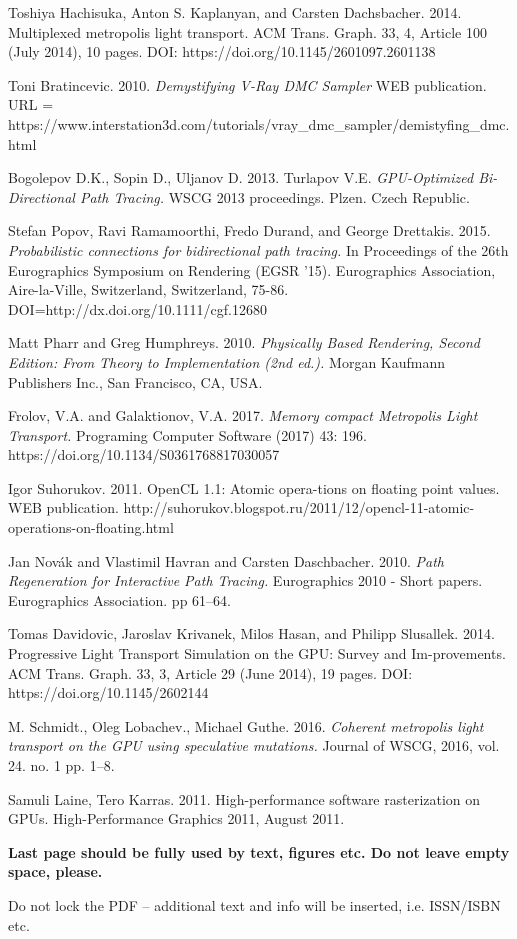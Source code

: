 \documentclass[twoside,twocolumn,10pt]{article}
\begin{document}
\begin{thebibliography}{99}
 Toshiya Hachisuka, Anton S. Kaplanyan, and Carsten Dachsbacher. 2014. Multiplexed metropolis light transport. ACM Trans. Graph. 33, 4, Article 100 (July 2014), 10 pages. DOI: https://doi.org/10.1145/2601097.2601138 

 Toni Bratincevic. 2010. \textit{Demystifying V-Ray DMC Sampler} WEB publication. URL = https://www.interstation3d.com/tutorials/vray\_dmc\_sampler/demistyfing\_dmc.html


 Bogolepov D.K., Sopin D., Uljanov D. 2013. Turlapov V.E. \textit{GPU-Optimized Bi-Directional Path Tracing.} WSCG 2013 proceedings. Plzen. Czech Republic.

 Stefan Popov, Ravi Ramamoorthi, Fredo Durand, and George Drettakis. 2015. \textit{Probabilistic connections for bidirectional path tracing.} In Proceedings of the 26th Eurographics Symposium on Rendering (EGSR '15). Eurographics Association, Aire-la-Ville, Switzerland, Switzerland, 75-86. DOI=http://dx.doi.org/10.1111/cgf.12680 

 Matt Pharr and Greg Humphreys. 2010. \textit{Physically Based Rendering, Second Edition: From Theory to Implementation (2nd ed.).} Morgan Kaufmann Publishers Inc., San Francisco, CA, USA.

 Frolov, V.A. and Galaktionov, V.A. 2017. \textit{Memory compact Metropolis Light Transport.} Programing Computer Software (2017) 43: 196. https://doi.org/10.1134/S0361768817030057

 Igor Suhorukov. 2011. OpenCL 1.1: Atomic opera-tions on floating point values. WEB publication. http://suhorukov.blogspot.ru/2011/12/opencl-11-atomic-operations-on-floating.html


 Jan Nov\'{a}k and Vlastimil Havran and Carsten Daschbacher. 2010. \textit{Path Regeneration for Interactive Path Tracing.} Eurographics 2010 - Short papers. Eurographics Association. pp 61--64.

 Tomas Davidovic, Jaroslav Krivanek, Milos Hasan, and Philipp Slusallek. 2014. Progressive Light Transport Simulation on the GPU: Survey and Im-provements. ACM Trans. Graph. 33, 3, Article 29 (June 2014), 19 pages. DOI: https://doi.org/10.1145/2602144

 M. Schmidt., Oleg Lobachev., Michael Guthe. 2016. \textit{Coherent metropolis light transport on the GPU using speculative mutations.} Journal of WSCG, 2016, vol. 24. no. 1 pp. 1--8.

 Samuli Laine, Tero Karras. 2011. High-performance software rasterization on GPUs. High-Performance Graphics 2011, August 2011. 


\end{thebibliography}

{\bfseries
Last page should be fully used by text, figures etc. Do not leave empty space, please. 

Do not lock the PDF -- additional text and info will be inserted, i.e. ISSN/ISBN etc. 
}
\end{document}
